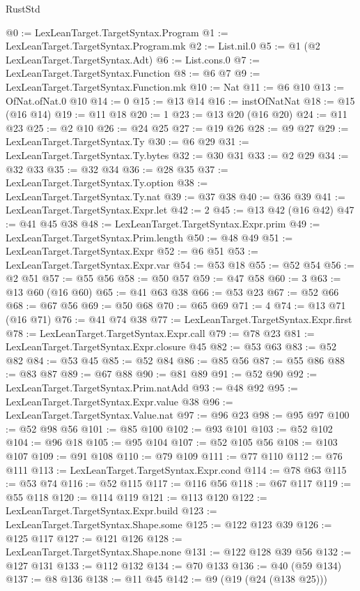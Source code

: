 \begin{lexlean}{RustStd}
\begin{coremodule}
@0 := LexLeanTarget.TargetSyntax.Program
@1 := LexLeanTarget.TargetSyntax.Program.mk
@2 := List.nil.{0}
@5 := @1 (@2 LexLeanTarget.TargetSyntax.Adt)
@6 := List.cons.{0}
@7 := LexLeanTarget.TargetSyntax.Function
@8 := @6 @7
@9 := LexLeanTarget.TargetSyntax.Function.mk
@10 := Nat
@11 := @6 @10
@13 := OfNat.ofNat.{0} @10
@14 := 0
@15 := @13 @14
@16 := instOfNatNat
@18 := @15 (@16 @14)
@19 := @11 @18
@20 := 1
@23 := @13 @20 (@16 @20)
@24 := @11 @23
@25 := @2 @10
@26 := @24 @25
@27 := @19 @26
@28 := @9 @27
@29 := LexLeanTarget.TargetSyntax.Ty
@30 := @6 @29
@31 := LexLeanTarget.TargetSyntax.Ty.bytes
@32 := @30 @31
@33 := @2 @29
@34 := @32 @33
@35 := @32 @34
@36 := @28 @35
@37 := LexLeanTarget.TargetSyntax.Ty.option
@38 := LexLeanTarget.TargetSyntax.Ty.nat
@39 := @37 @38
@40 := @36 @39
@41 := LexLeanTarget.TargetSyntax.Expr.let
@42 := 2
@45 := @13 @42 (@16 @42)
@47 := @41 @45 @38
@48 := LexLeanTarget.TargetSyntax.Expr.prim
@49 := LexLeanTarget.TargetSyntax.Prim.length
@50 := @48 @49
@51 := LexLeanTarget.TargetSyntax.Expr
@52 := @6 @51
@53 := LexLeanTarget.TargetSyntax.Expr.var
@54 := @53 @18
@55 := @52 @54
@56 := @2 @51
@57 := @55 @56
@58 := @50 @57
@59 := @47 @58
@60 := 3
@63 := @13 @60 (@16 @60)
@65 := @41 @63 @38
@66 := @53 @23
@67 := @52 @66
@68 := @67 @56
@69 := @50 @68
@70 := @65 @69
@71 := 4
@74 := @13 @71 (@16 @71)
@76 := @41 @74 @38
@77 := LexLeanTarget.TargetSyntax.Expr.first
@78 := LexLeanTarget.TargetSyntax.Expr.call
@79 := @78 @23
@81 := LexLeanTarget.TargetSyntax.Expr.closure @45
@82 := @53 @63
@83 := @52 @82
@84 := @53 @45
@85 := @52 @84
@86 := @85 @56
@87 := @55 @86
@88 := @83 @87
@89 := @67 @88
@90 := @81 @89
@91 := @52 @90
@92 := LexLeanTarget.TargetSyntax.Prim.natAdd
@93 := @48 @92
@95 := LexLeanTarget.TargetSyntax.Expr.value @38
@96 := LexLeanTarget.TargetSyntax.Value.nat
@97 := @96 @23
@98 := @95 @97
@100 := @52 @98 @56
@101 := @85 @100
@102 := @93 @101
@103 := @52 @102
@104 := @96 @18
@105 := @95 @104
@107 := @52 @105 @56
@108 := @103 @107
@109 := @91 @108
@110 := @79 @109
@111 := @77 @110
@112 := @76 @111
@113 := LexLeanTarget.TargetSyntax.Expr.cond
@114 := @78 @63
@115 := @53 @74
@116 := @52 @115
@117 := @116 @56
@118 := @67 @117
@119 := @55 @118
@120 := @114 @119
@121 := @113 @120
@122 := LexLeanTarget.TargetSyntax.Expr.build
@123 := LexLeanTarget.TargetSyntax.Shape.some
@125 := @122 @123 @39
@126 := @125 @117
@127 := @121 @126
@128 := LexLeanTarget.TargetSyntax.Shape.none
@131 := @122 @128 @39 @56
@132 := @127 @131
@133 := @112 @132
@134 := @70 @133
@136 := @40 (@59 @134)
@137 := @8 @136
@138 := @11 @45
@142 := @9 (@19 (@24 (@138 @25)))

\end{coremodule}
\end{lexlean}
